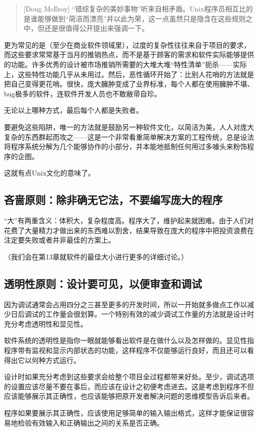 \documentclass[12pt,oneside]{ctexbook}
\begin{document}
\begin{common-format}
\begin{quote}[Doug McIlroy]
“错综复杂的美妙事物”听来自相矛盾。Unix程序员相互比的是谁能够做到“简洁而漂亮”并以此为荣，这一点虽然只是隐含在这些规则之中，但还是很值得公开提出来强调一下。
\end{quote}

更为常见的是（至少在商业软件领域里），过度的复杂性往往来自于项目的要求，而这些要求常常基于当月的推销热点，而不是基于顾客的需求和软件实际能够提供的功能。许多优秀的设计被市场推销所需要的大堆大堆“特性清单”扼杀——实际上，这些特性功能几乎从未用过。然后，恶性循环开始了：比别人花哨的方法就是把自己变得更花哨。很快，庞大臃肿变成了业界标准，每个人都在使用臃肿不堪、bug极多的软件，连软件开发人员也不敢敝帚自珍。

无论以上哪种方式，最后每个人都是失败者。

要避免这些陷阱，唯一的方法就是鼓励另一种软件文化，以简洁为美，人人对庞大复杂的东西群起而攻之——这是一个非常看重简单解决方案的工程传统，总是设法将程序系统分解为几个能够协作的小部分，并本能地抵制任何用过多噱头来粉饰程序的企图。

这就有点Unix文化的意味了。

\subsection{吝啬原则：除非确无它法，不要编写庞大的程序}
“大”有两重含义：体积大，复杂程度高。程序大了，维护起来就困难。由于人们对花费了大量精力才做出来的东西难以割舍，结果导致在庞大的程序中把投资浪费在注定要失败或者并非最佳的方案上。

（我们会在第13章就软件的最佳大小进行更多的详细讨论。）

\subsection{透明性原则：设计要可见，以便审查和调试}
因为调试通常会占用四分之三甚至更多的开发时间，所以一开始就多做点工作以减少日后调试的工作量会很划算。一个特别有效的减少调试工作量的方法就是设计时充分考虑透明性和显见性。

软件系统的透明性是指你一眼就能够看出软件是在做什么以及怎样做的。显见性指程序带有监视和显示内部状态的功能，这样程序不仅能够运行良好，而且还可以看得出它以何种方式运行。

设计时如果充分考虑到这些要求会给整个项目全过程都带来好处。至少，调试选项的设置应该尽量不要在事后，而应该在设计之初便考虑进去。这是考虑到程序不但应该能够展示其正确性，也应该能够把原开发者解决问题的思维模型告诉后来者。

程序如果要展示其正确性，应该使用足够简单的输入输出格式，这样才能保证很容易地检验有效输入和正确输出之间的关系是否正确。


\end{common-format}
\end{document}
